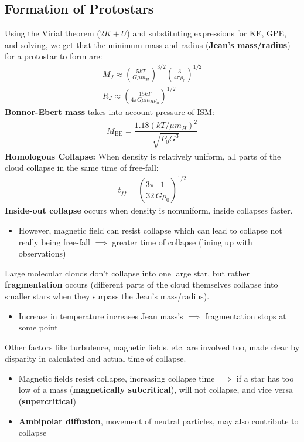 \documentclass[12pt]{article}
\begin{document}
\subsection{Formation of Protostars}
Using the Virial theorem ($2K + U$) and substituting expressions for KE, GPE, and solving, we get that the minimum mass and radius (\textbf{Jean's mass/radius}) for a protostar to form are:
\begin{align*}
M_J \approx \left(\frac{5kT}{G\mu m_H}\right)^{3/2}\left(\frac{3}{4\pi\rho_0}\right)^{1/2} \\
R_J \approx \left(\frac{15kT}{4\pi G\mu m_H\rho_0}\right)^{1/2}
\end{align*}
\textbf{Bonnor-Ebert mass} takes into account pressure of ISM: 
\begin{align*}
M_{\text{BE}} = \dfrac{1.18(kT/\mu m_H)^2}{\sqrt{P_0G^3}}
\end{align*}
\textbf{Homologous Collapse:} When density is relatively uniform, all parts of the cloud collapse in the same time of free-fall: 
\begin{align*}
t_{ff} = \left(\dfrac{3\pi}{32}\dfrac{1}{G\rho_0}\right)^{1/2}
\end{align*} 
\textbf{Inside-out collapse} occurs when density is nonuniform, inside collapses faster.
\begin{itemize}
\item However, magnetic field can resist collapse which can lead to collapse not really being free-fall $\implies$ greater time of collapse (lining up with observations)
\end{itemize}
Large molecular clouds don't collapse into one large star, but rather \textbf{fragmentation} occurs (different parts of the cloud themselves collapse into smaller stars when they surpass the Jean's mass/radius).
\begin{itemize}
    \item Increase in temperature increases Jean mass's $\implies$ fragmentation stops at some point
\end{itemize}

Other factors like turbulence, magnetic fields, etc. are involved too, made clear by disparity in calculated and actual time of collapse.
\begin{itemize}
    \item Magnetic fields resist collapse, increasing collapse time $\implies$ if a star has too low of a mass (\textbf{magnetically subcritical}), will not collapse, and vice versa (\textbf{supercritical})
    \item \textbf{Ambipolar diffusion}, movement of neutral particles, may also contribute to collapse
\end{itemize}
\end{document}
